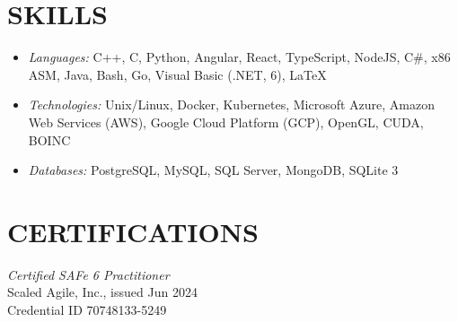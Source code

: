 \documentclass[margin]{res} %
\begin{document}
\begin{resume}


\pagebreak



\section{SKILLS}

\begin{itemize}[leftmargin=0cm, label={}]
    \item {\sl Languages:\/} 
    C++, C, Python, Angular, React, TypeScript, NodeJS, C\#, x86 ASM, Java, Bash, Go, Visual Basic (.NET, 6), {\LaTeX} 
    \item {\sl Technologies:\/} 
    Unix/Linux, Docker, Kubernetes, Microsoft Azure, Amazon Web Services (AWS), Google Cloud Platform (GCP), OpenGL, CUDA, BOINC
    \item {\sl Databases:\/}
    PostgreSQL, MySQL, SQL Server, MongoDB, SQLite 3
\end{itemize}

\section{CERTIFICATIONS}

{\sl Certified SAFe\textsuperscript{\tiny\textregistered} 6 Practitioner\/}\\
Scaled Agile, Inc., issued Jun 2024\\
Credential ID 70748133-5249





\end{resume}
\end{document}
